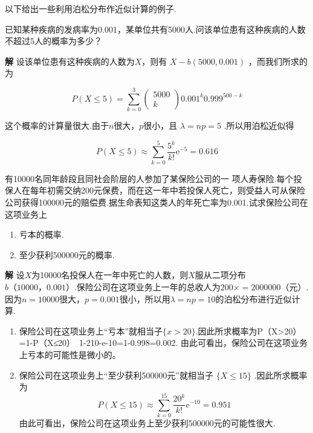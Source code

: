 以下给出一些利用泊松分布作近似计算的例子.

\begin{example}
	已知某种疾病的发病率为0.001，某单位共有5000人.问该单位患有这种疾病的人数不超过5人的概率为多少？
	
	\textbf{解} 设该单位患有这种疾病的人数为$ X $，则有 $X-b(5000,0.001)$ ，而我们所求的为
	
	\[
	P(X \leqslant 5)=\sum_{k=0}^{3} \left( \begin{array}{c}{5000} \\ {k}\end{array}\right) 0.001^{k} 0.999^{500-k}
	\]
	
	这个概率的计算量很大.由于$ n $很大，$ p $很小，且 $\lambda=n p=5$ .所以用泊松近似得
	
	\[
	P(X \leqslant 5) \approx \sum_{k=0}^{5} \frac{5^{k}}{k !} \mathrm{e}^{-5}=0.616
	\]
	
\end{example}

\begin{example}
	有10000名同年龄段且同社会阶层的人参加了某保险公司的一
	项人寿保险.每个投保人在每年初需交纳200元保费，而在这一年中若投保人死亡，则受益人可从保险公司获得100000元的赔偿费.据生命表知这类人的年死亡率为0.001.试求保险公司在这项业务上
	
	\begin{enumerate}
		\item 亏本的概率.
		\item 至少获利500000元的概率.
	\end{enumerate}
	
	\textbf{解} 设$ X $为10000名投保人在一年中死亡的人数，则$ X $服从二项分布$ b（10000，0.001） $.保险公司在这项业务上一年的总收人为$ 200\times = 2000000（\text{元}） $.因为$ n=10000 $很大，$ p=0.001 $很小，所以用$ \lambda =np=10 $的泊松分布进行近似计算.
	
	\begin{enumerate}
		\item 保险公司在这项业务上“亏本”就相当子$ \{x>20\} $.因此所求概率为P（X>20）=1-P（X≤20）~1-210-e-10=1-0.998=0.002.
		由此可看出，保险公司在这项业务上亏本的可能性是微小的。
		\item 保险公司在这项业务上“至少获利500000元”就相当子 $\{X \leqslant 15\}$ .因此所求概率为
		\[
		P(X \leqslant 15) \approx \sum_{k=0}^{15} \frac{20^{k}}{k !} \mathrm{e}^{-10}=0.951
		\]
		由此可看出，保险公司在这项业务上至少获利500000元的可能性很大.
	\end{enumerate}
\end{example}

